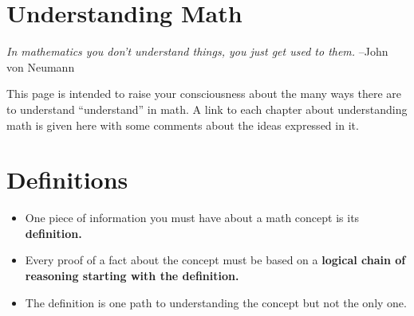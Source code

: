 \section*{Understanding Math}
    \textit{In mathematics you don’t understand things, you just get used to them.}
    –John von Neumann

    This page is intended to raise your consciousness about the many ways there are
    to understand “understand” in math. A link to each chapter about understanding
    math is given here with some comments about the ideas expressed in it.

\section*{Definitions}
    \begin{itemize}
        \item{One piece of information you must have about a math concept is its \textbf{definition.}}
        \item{Every proof of a fact about the concept must be based on a \textbf{logical chain of reasoning starting with the definition.}}
        \item{The definition is one path to understanding the concept but not the only one.}
    \end{itemize}
